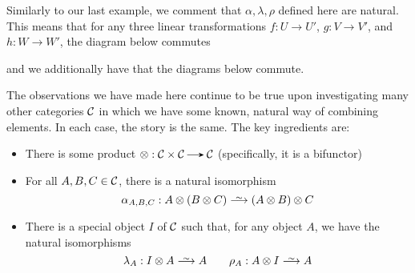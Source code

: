 \begin{example}
    Similarly to our last example, we comment that $\alpha, \lambda, \rho$ defined here 
    are natural. This means that for any three linear transformations 
    $f: U \to U'$, $g: V \to V'$, and $h: W \to W'$, the diagram below commutes
    \begin{center}
    \end{center}
    and we additionally have that the diagrams below commute. 
    \begin{center}
        \hspace{1cm}
    \end{center}
\end{example}

The observations we have made here continue to be true upon investigating many
other categories $\mathcal{C}$ in which we have some known, natural way of combining elements. In each case, the 
story is the same. The key ingredients are:
\begin{itemize}
    \item There is some product $\otimes: \cc \times \cc \to \cc$ (specifically, it is a bifunctor)
    \item For all $A, B, C \in \mathcal{C}$, there is a natural isomorphism 
    \[
        \alpha_{A,B,C}: A \otimes (B \otimes C) \isomarrow (A \otimes B) \otimes C
    \] 
    \item There is a special object $I$ of $\mathcal{C}$ such that, for any object $A$, we have 
    the natural isomorphisms 
    \[
        \lambda_{A}: I \otimes A \isomarrow A \qquad \rho_{A}: A \otimes I \isomarrow A     
    \]
\end{itemize}

